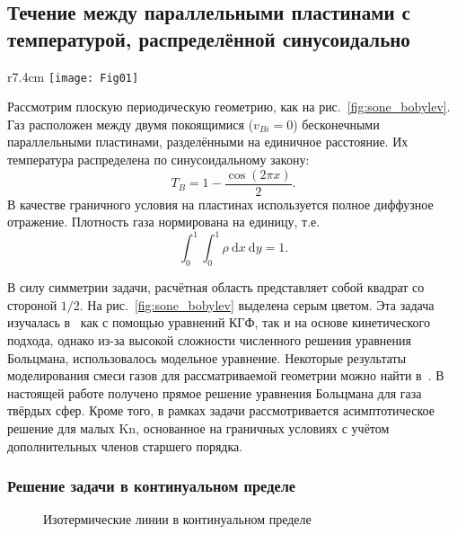 \documentclass[
aps,%
12pt,%
final,%
notitlepage,%
oneside,%
onecolumn,%
nobibnotes,%
nofootinbib,%
superscriptaddress,%
noshowpacs,%
showkeys,%
tightenlines,%
centertags]%
{revtex4}
\newcommand{\Kn}{\mathrm{Kn}}
\newcommand{\dd}{\:\mathrm{d}}
\begin{document}
\subsection{Течение между параллельными пластинами с температурой, распределённой синусоидально}

\begin{wrapfigure}{r}{7.4cm}
    \vspace{-10pt}
    \centering
    \texttt{[image: Fig01]}
    \vspace{-20pt}
    \caption{Геометрия задачи}\label{fig:sone_bobylev}
    \vspace{20pt}
\end{wrapfigure}

Рассмотрим плоскую периодическую геометрию, как на рис.~\ref{fig:sone_bobylev}.
Газ расположен между двумя покоящимися (\(v_{Bi} = 0\)) бесконечными параллельными пластинами,
разделёнными на единичное расстояние. Их температура распределена по синусоидальному закону:
\begin{equation}
    T_B = 1 - \frac{\cos(2\pi x)}{2}.
\end{equation}
В качестве граничного условия на пластинах используется полное диффузное отражение.
Плотность газа нормирована на единицу, т.е.
\begin{equation}\label{eq:total_mass}
    \int_0^1\int_0^1\rho\dd{x}\dd{y} = 1.
\end{equation}

В силу симметрии задачи, расчётная область представляет собой квадрат со стороной \(1/2\).
На рис.~\ref{fig:sone_bobylev} выделена серым цветом.
Эта задача изучалась в~\cite{Sone1996} как с помощью уравнений КГФ, так и на основе кинетического подхода,
однако из-за высокой сложности численного решения уравнения Больцмана, использовалось модельное уравнение.
Некоторые результаты моделирования смеси газов для рассматриваемой геометрии можно найти в~\cite{Wu2015}.
В настоящей работе получено прямое решение уравнения Больцмана для газа твёрдых сфер.
Кроме того, в рамках задачи рассмотривается асимптотическое решение для малых \(\Kn\),
основанное на граничных условиях с учётом дополнительных членов старшего порядка.

\subsubsection{Решение задачи в континуальном пределе}

\begin{figure}
    \centering
    \caption{Изотермические линии в континуальном пределе}
    \label{fig:continuum:temp}
\end{figure}
\end{document}
